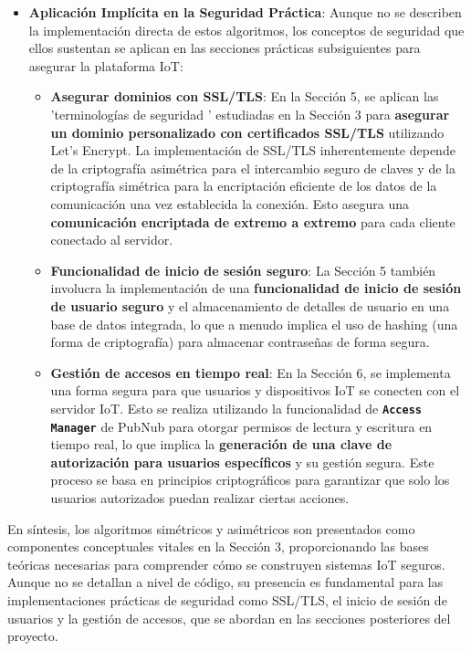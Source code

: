 \documentclass{report}
\begin{document}
\begin{itemize}
    \item \textbf{Aplicación Implícita en la Seguridad Práctica}: Aunque no se  describen la implementación directa de estos algoritmos, los 
    conceptos de seguridad que ellos sustentan se aplican en las secciones prácticas subsiguientes para asegurar la plataforma IoT:
    \begin{itemize}
        \item \textbf{Asegurar dominios con SSL/TLS}: En la Sección 5, se aplican las  'terminologías de seguridad ' estudiadas en la Sección 3 para 
        \textbf{asegurar un dominio personalizado con certificados SSL/TLS} utilizando Let's Encrypt. La implementación de SSL/TLS inherentemente depende 
        de la criptografía asimétrica para el intercambio seguro de claves y de la criptografía simétrica para la encriptación eficiente de los datos de 
        la comunicación una vez establecida la conexión. Esto asegura una \textbf{comunicación encriptada de extremo a extremo} para cada cliente conectado 
        al servidor.
        \item \textbf{Funcionalidad de inicio de sesión seguro}: La Sección 5 también involucra la implementación de una \textbf{funcionalidad de inicio 
        de sesión de usuario seguro} y el almacenamiento de detalles de usuario en una base de datos integrada, lo que a menudo implica el uso de hashing 
        (una forma de criptografía) para almacenar contraseñas de forma segura.
        \item \textbf{Gestión de accesos en tiempo real}: En la Sección 6, se implementa una forma segura para que usuarios y dispositivos IoT se conecten 
        con el servidor IoT. Esto se realiza utilizando la funcionalidad de \textbf{\texttt{Access Manager}} de PubNub para otorgar permisos de lectura y 
        escritura en tiempo real, lo que implica la \textbf{generación de una clave de autorización para usuarios específicos} y su gestión segura. 
        Este proceso se basa en principios criptográficos para garantizar que solo los usuarios autorizados puedan realizar ciertas acciones.
    \end{itemize}
\end{itemize}
En síntesis, los algoritmos simétricos y asimétricos son presentados como componentes conceptuales vitales en la Sección 3, proporcionando las bases 
teóricas necesarias para comprender cómo se construyen sistemas IoT seguros. Aunque no se detallan a nivel de código, su presencia es fundamental para 
las implementaciones prácticas de seguridad como SSL/TLS, el inicio de sesión de usuarios y la gestión de accesos, que se abordan en las secciones 
posteriores del proyecto.
\end{document}
